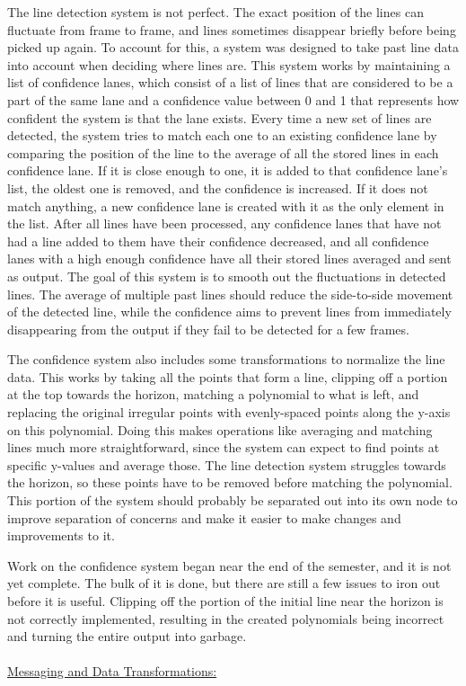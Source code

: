\documentclass[titlepage,draft]{article}
\begin{document}
The line detection system is not perfect. The exact position of the lines can fluctuate from frame to frame, and lines sometimes disappear briefly before being picked up again. To account for this, a system was designed to take past line data into account when deciding where lines are. This system works by maintaining a list of confidence lanes, which consist of a list of lines that are considered to be a part of the same lane and a confidence value between 0 and 1 that represents how confident the system is that the lane exists. Every time a new set of lines are detected, the system tries to match each one to an existing confidence lane by comparing the position of the line to the average of all the stored lines in each confidence lane. If it is close enough to one, it is added to that confidence lane's list, the oldest one is removed, and the confidence is increased. If it does not match anything, a new confidence lane is created with it as the only element in the list. After all lines have been processed, any confidence lanes that have not had a line added to them have their confidence decreased, and all confidence lanes with a high enough confidence have all their stored lines averaged and sent as output. The goal of this system is to smooth out the fluctuations in detected lines. The average of multiple past lines should reduce the side-to-side movement of the detected line, while the confidence aims to prevent lines from immediately disappearing from the output if they fail to be detected for a few frames.

The confidence system also includes some transformations to normalize the line data. This works by taking all the points that form a line, clipping off a portion at the top towards the horizon, matching a polynomial to what is left, and replacing the original irregular points with evenly-spaced points along the y-axis on this polynomial. Doing this makes operations like averaging and matching lines much more straightforward, since the system can expect to find points at specific y-values and average those. The line detection system struggles towards the horizon, so these points have to be removed before matching the polynomial. This portion of the system should probably be separated out into its own node to improve separation of concerns and make it easier to make changes and improvements to it.

Work on the confidence system began near the end of the semester, and it is not yet complete. The bulk of it is done, but there are still a few issues to iron out before it is useful. Clipping off the portion of the initial line near the horizon is not correctly implemented, resulting in the created polynomials being incorrect and turning the entire output into garbage.
\\~\\
\underline{Messaging and Data Transformations:}
\end{document}
